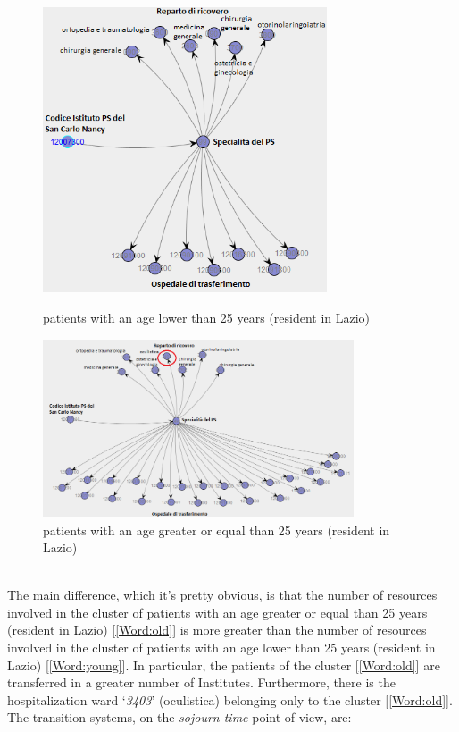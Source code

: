 \begin{figure} [htbp]
\includegraphics[width=0.75\textwidth, keepaspectratio]{ProntoSoccorsoHoWYoungs}
\caption{patients with an age lower than 25 years (resident in Lazio)}
\includegraphics[width=0.82\textwidth, keepaspectratio]{ProntoSoccorsoHoWOlds}
\caption{patients with an age greater or equal than 25 years (resident in Lazio)}
\end{figure}\\
The main difference, which it’s pretty obvious, is that the number of resources involved in the cluster of patients with an age greater or equal than 25 years (resident in Lazio) [\ref{Word:old}] is more greater than the number of resources involved in the cluster of patients with an age lower than 25 years (resident in Lazio) [\ref{Word:young}]. In particular, the patients of the cluster [\ref{Word:old}] are transferred in a greater number of Institutes. Furthermore, there is the hospitalization ward `\textit{3403}' (oculistica) belonging only to the cluster [\ref{Word:old}]. The transition systems, on the \textit{sojourn time} point of view, are:
